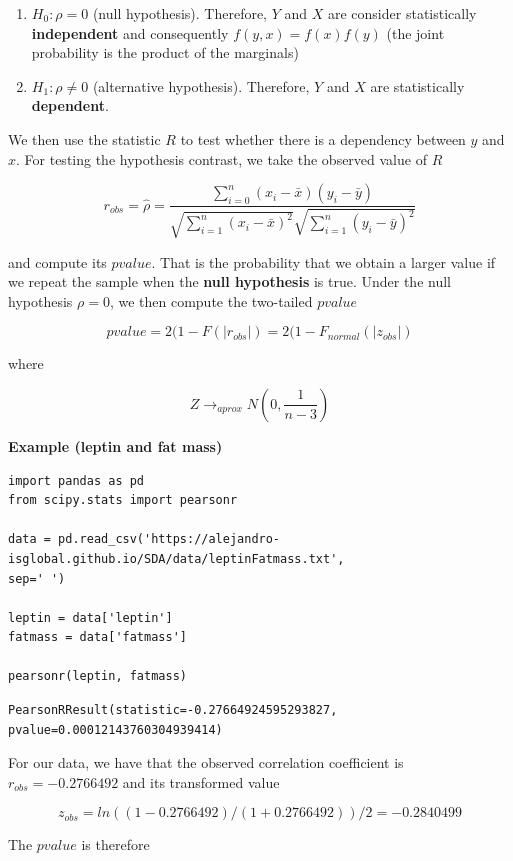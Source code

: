 \documentclass[
]{book}
\begin{document}
\begin{enumerate}
\def\labelenumi{\alph{enumi}.}
\item
  \(H_0: \rho=0\) (null hypothesis). Therefore, \(Y\) and \(X\) are consider statistically \textbf{independent} and consequently \(f(y,x)=f(x)f(y)\) (the joint probability is the product of the marginals)
\item
  \(H_1: \rho \neq 0\) (alternative hypothesis). Therefore, \(Y\) and \(X\) are statistically \textbf{dependent}.
\end{enumerate}

We then use the statistic \(R\) to test whether there is a dependency between \(y\) and \(x\). For testing the hypothesis contrast, we take the observed value of \(R\)

\[r_{obs}=\hat{\rho}=\frac{\sum_{i=0}^n(x_i-\bar{x})(y_i-\bar{y})}{\sqrt{\sum_{i=1}^n(x_i-\bar{x})^2}\sqrt{\sum_{i=1}^n(y_i-\bar{y})^2}}\]

and compute its \(pvalue\). That is the probability that we obtain a larger value if we repeat the sample when the \textbf{null hypothesis} is true. Under the null hypothesis \(\rho=0\), we then compute the two-tailed \(pvalue\)

\[pvalue=2(1- F(|r_{obs}|)= 2(1- F_{normal}(|z_{obs}|)  \]

where

\[Z \rightarrow_{aprox} N(0, \frac{1}{n-3})\]

\textbf{Example (leptin and fat mass)}

\begin{verbatim}
import pandas as pd
from scipy.stats import pearsonr

data = pd.read_csv('https://alejandro-isglobal.github.io/SDA/data/leptinFatmass.txt', 
sep=' ')

leptin = data['leptin']
fatmass = data['fatmass']

pearsonr(leptin, fatmass)
\end{verbatim}

\begin{verbatim}
PearsonRResult(statistic=-0.27664924595293827, pvalue=0.00012143760304939414)
\end{verbatim}

For our data, we have that the observed correlation coefficient is \(r_{obs}=-0.2766492\) and its transformed value

\[z_{obs}=ln((1-0.2766492)/(1+0.2766492))/2=-0.2840499\]

The \(pvalue\) is therefore
\end{document}
